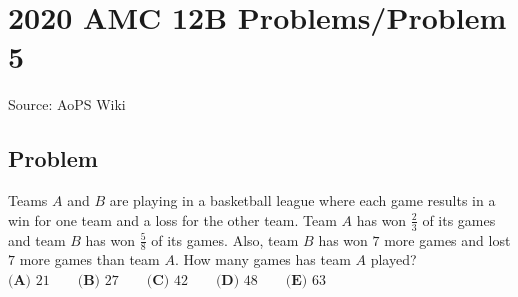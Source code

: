 \documentclass[12pt]{article}
\begin{document}
\section*{{2020 AMC 12B Problems/Problem 5}}
Source: AoPS Wiki

\subsection*{Problem}
Teams $A$ and $B$ are playing in a basketball league where each game results in a win for one team and a loss for the other team. Team $A$ has won $\tfrac{2}{3}$ of its games and team $B$ has won $\tfrac{5}{8}$ of its games. Also, team $B$ has won $7$ more games and lost $7$ more games than team $A.$ How many games has team $A$ played? $\textbf{(A) } 21 \qquad \textbf{(B) } 27 \qquad \textbf{(C) } 42 \qquad \textbf{(D) } 48 \qquad \textbf{(E) } 63$
\end{document}
